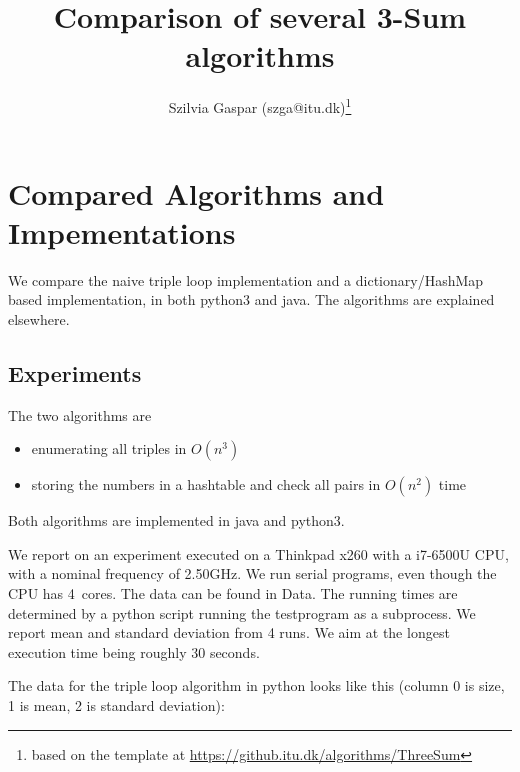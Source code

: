 \documentclass[nobib]{tufte-handout}
\title{Comparison of several 3-Sum algorithms}
\author{Szilvia Gaspar (szga@itu.dk)\thanks{based on the template at
\url{https://github.itu.dk/algorithms/ThreeSum}}}
\begin{document}
\maketitle

\section{Compared Algorithms and Impementations}

We compare the naive triple loop implementation and a dictionary/HashMap based implementation, in both python3 and java.
The algorithms are explained elsewhere.

%

\subsection{Experiments}

The two algorithms are
\begin{itemize}
\item enumerating all triples in $O(n^3)$
\item storing the numbers in a hashtable and check all pairs in $O(n^2)$ time
\end{itemize}

Both algorithms are implemented in java and python3.


\newcommand{\tableDir}{Data}
\newcommand{\xtableDir}{Data}
We report on an experiment executed on a Thinkpad x260 with a i7-6500U CPU, with a  nominal frequency of 2.50GHz.
We run serial programs, even though the CPU has 4~cores.
The data can be found in \tableDir.
The running times are determined by a python script running the testprogram as a subprocess.
We report mean and standard deviation from 4 runs.
We aim at the longest execution time being roughly 30 seconds.

The data for the triple loop algorithm in python looks like this (column 0 is size, 1 is mean, 2 is standard deviation):
\end{document}
